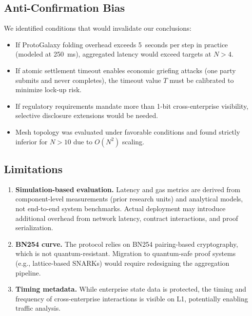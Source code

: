 \documentclass[conference]{IEEEtran}
\begin{document}
\subsection{Anti-Confirmation Bias}

We identified conditions that would invalidate our conclusions:

\begin{itemize}
  \item If ProtoGalaxy folding overhead exceeds 5~seconds per step in
        practice (modeled at 250~ms), aggregated latency would exceed targets
        at $N > 4$.
  \item If atomic settlement timeout enables economic griefing attacks (one
        party submits and never completes), the timeout value $T$ must be
        calibrated to minimize lock-up risk.
  \item If regulatory requirements mandate more than 1-bit cross-enterprise
        visibility, selective disclosure extensions would be needed.
  \item Mesh topology was evaluated under favorable conditions and found
        strictly inferior for $N > 10$ due to $O(N^2)$ scaling.
\end{itemize}

\subsection{Limitations}

\begin{enumerate}
  \item \textbf{Simulation-based evaluation.} Latency and gas metrics are
        derived from component-level measurements (prior research units) and
        analytical models, not end-to-end system benchmarks. Actual
        deployment may introduce additional overhead from network latency,
        contract interactions, and proof serialization.
  \item \textbf{BN254 curve.} The protocol relies on BN254 pairing-based
        cryptography, which is not quantum-resistant. Migration to
        quantum-safe proof systems (e.g., lattice-based SNARKs) would require
        redesigning the aggregation pipeline.
  \item \textbf{Timing metadata.} While enterprise state data is protected,
        the timing and frequency of cross-enterprise interactions is visible
        on L1, potentially enabling traffic analysis.
\end{enumerate}
\end{document}
